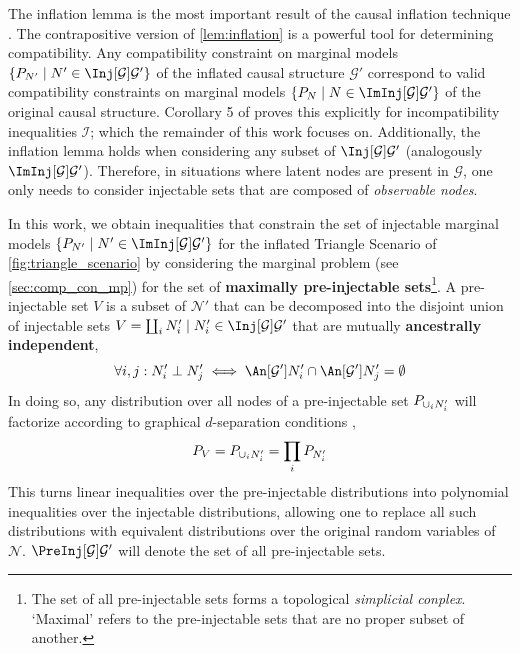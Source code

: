 \documentclass[aps, 10pt, english, twoside, pra, nofootinbib, longbibliography]{revtex4-1}
\theoremstyle{plain}
\theoremstyle{definition}
\theoremstyle{remark}
\newcommand{\graph}{\mathcal{G}}
\newcommand{\nodes}{\mathcal{N}}
\newcommand{\ancestralindep}{\perp}
\newcommand{\term}[1]{\textcolor{Mahogany}{\textbf{#1}}}
\begin{document}
    The inflation lemma is the most important result of the causal inflation technique \cite{Inflation}. The contrapositive version of \cref{lem:inflation} is a powerful tool for determining compatibility. Any compatibility constraint on marginal models $\bc{\prob[N'] \mid N' \in \Inj[\graph]{\graph'}}$ of the inflated causal structure $\graph'$ correspond to valid compatibility constraints on marginal models $\bc{\prob[N] \mid N \in \ImInj[\graph]{\graph'}}$ of the original causal structure. Corollary 5 of \cite{Inflation} proves this explicitly for incompatibility inequalities $\mathcal{I}$; which the remainder of this work focuses on.  Additionally, the inflation lemma holds when considering any subset of $\Inj[\graph]{\graph'}$ (analogously $\ImInj[\graph]{\graph'}$). Therefore, in situations where latent nodes are present in $\graph$, one only needs to consider injectable sets that are composed of \textit{observable nodes}.

    In this work, we obtain inequalities that constrain the set of injectable marginal models $\bc{\prob[N'] \mid N' \in \ImInj[\graph]{\graph'}}$ for the inflated Triangle Scenario of \cref{fig:triangle_scenario} by considering the marginal problem (see \cref{sec:comp_con_mp}) for the set of \term{maximally pre-injectable sets}\footnote{The set of all pre-injectable sets forms a topological \textit{simplicial conplex}. `Maximal' refers to the pre-injectable sets that are no proper subset of another.}. A pre-injectable set $V$ is a subset of $\nodes'$ that can be decomposed into the disjoint union of injectable sets $V = \coprod_i N'_i \mid N'_i \in \Inj[\graph]{\graph'}$ that are mutually \term{ancestrally independent},
    \[ \forall i,j : N'_i \ancestralindep N'_j \iff \An[\graph']{N'_i} \cap \An[\graph']{N'_j} = \emptyset  \]
    In doing so, any distribution over all nodes of a pre-injectable set $\prob[\cup_i N'_i]$ will factorize according to graphical $d$-separation conditions \cite{Pearl_2009},
    \[ \prob[V] = \prob[\cup_i N'_i] = \prod_{i}\prob[N'_i] \]
    This turns linear inequalities over the pre-injectable distributions into polynomial inequalities over the injectable distributions, allowing one to replace all such distributions with equivalent distributions over the original random variables of $\nodes$. $\PreInj[\graph]{\graph'}$ will denote the set of all pre-injectable sets.
\end{document}

